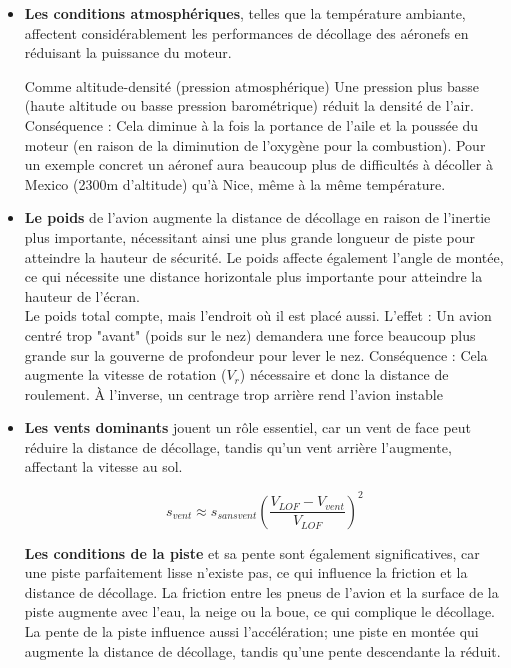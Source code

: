 	\begin{itemize}
		\item \textbf{Les conditions atmosphériques}, telles que la température ambiante, affectent considérablement les performances de décollage des aéronefs en réduisant la puissance du moteur.
		
		
		Comme altitude-densité (pression atmosphérique)
		Une pression plus basse (haute altitude ou basse pression barométrique) réduit la densité de l'air.
		Conséquence : Cela diminue à la fois la portance de l'aile et la poussée du moteur (en raison de la diminution de l'oxygène pour la combustion). 
		Pour un exemple concret un aéronef aura beaucoup plus de difficultés à décoller à Mexico (2300m d'altitude) qu'à Nice, même à la même température.
		
		
		\item\textbf{Le poids} de l'avion augmente la distance de décollage en raison de l'inertie plus importante, nécessitant ainsi une plus grande longueur de piste pour atteindre la hauteur de sécurité. Le poids affecte également l'angle de montée, ce qui nécessite une distance horizontale plus importante pour atteindre la hauteur de l'écran. \\
		
		Le poids total compte, mais l'endroit où il est placé aussi.
		L'effet : Un avion centré trop "avant" (poids sur le nez) demandera une force beaucoup plus grande sur la gouverne de profondeur pour lever le nez.
		Conséquence : Cela augmente la vitesse de rotation ($V_r$) nécessaire et donc la distance de roulement. À l'inverse, un centrage trop arrière rend l'avion instable
		
		\item\textbf{Les vents dominants} jouent un rôle essentiel, car un vent de face peut réduire la distance de décollage, tandis qu'un vent arrière l'augmente, affectant la vitesse au sol.
		
		
		\begin{equation}
			s_{vent} \approx s_{sans vent} \left( \frac{V_{LOF} - V_{vent}}{V_{LOF}} \right)^2
		\end{equation}
		
		\textbf{Les conditions de la piste} et sa pente sont également significatives, car une piste parfaitement lisse n'existe pas, ce qui influence la friction et la distance de décollage.
		La friction entre les pneus de l'avion et la surface de la piste augmente avec l'eau, la neige ou la boue, ce qui complique le décollage.
		La pente de la piste influence aussi  l'accélération; une piste en montée qui augmente la distance de décollage, tandis qu'une pente descendante la réduit.\\
		
		
		\end{itemize}
			
